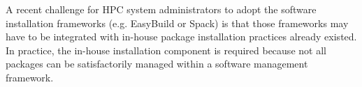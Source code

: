 \documentclass[conference]{IEEEtran}
\begin{document}


A recent challenge for HPC system administrators to adopt the software installation frameworks (e.g. EasyBuild\cite{geimer:14} or Spack\cite{gamblin:15}) is that those frameworks may have to be integrated with in-house package installation practices already existed. In practice, the in-house installation component is required because not all packages can be satisfactorily managed within a software management framework.
\end{document}
